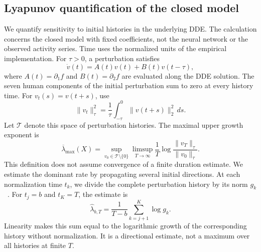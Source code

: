 \subsection{Lyapunov quantification of the closed model}
\begingroup\color{red}
We quantify sensitivity to initial histories in the underlying DDE.
The calculation concerns the closed model with fixed coefficients,
not the neural network or the observed activity series.
Time uses the normalized units of the empirical implementation.
For $\tau>0$, a perturbation satisfies
\begin{equation}
\dot v(t)=A(t)v(t)+B(t)v(t-\tau),
\label{eq:lyapunov_variation}
\end{equation}
where $A(t)=\partial_1 f$ and $B(t)=\partial_2 f$ are evaluated
along the DDE solution.
The seven human components of the initial perturbation sum to zero
at every history time.
For $v_t(s)=v(t+s)$, use
\[
\|v_t\|_\tau^2
=\frac{1}{\tau}\int_{-\tau}^{0}\|v(t+s)\|_2^2\,ds.
\]
Let $\mathcal T$ denote this space of perturbation histories.
The maximal upper growth exponent is
\[
\overline\lambda_{\max}(X)
=\sup_{v_0\in\mathcal T\setminus\{0\}}
\limsup_{T\to\infty}
\frac{1}{T}\log\frac{\|v_T\|_\tau}{\|v_0\|_\tau}.
\]
This definition does not assume convergence of a finite duration estimate.
We estimate the dominant rate by propagating several initial directions.
At each normalization time $t_k$, we divide the complete perturbation
history by its norm $g_k$~\cite{ansmann2018lyapunov}.
For $t_j=b$ and $t_K=T$, the estimate is
\begin{equation}
\widehat\lambda_{b,T}
=\frac{1}{T-b}\sum_{k=j+1}^{K}\log g_k.
\label{eq:lyapunov_growth_identity}
\end{equation}
Linearity makes this sum equal to the logarithmic growth of the
corresponding history without normalization.
It is a directional estimate, not a maximum over all histories
at finite $T$.

